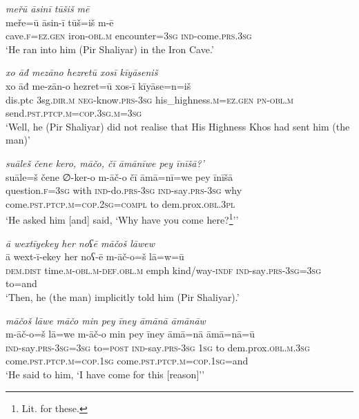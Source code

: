 \ea \label{ŽP.133}
\textit{meřū āsinī tūšiš mē} \\ 
\gll meře=ū āsin-ī tūš=iš m-ē \\ 
 cave\textsc{.f}\textsc{\textsc{=ez.gen}} iron\textsc{-obl}\textsc{.m} encounter\textsc{=3sg} \textsc{ind-}come\textsc{.prs}\textsc{.3sg} \\ 
\glt `He ran into him (Pir Shaliyar) in the Iron Cave.'
\z 
 
\ea \label{ŽP.134}
\textit{xo āđ mezāno hezretū xosī kīyāseniš} \\ 
\gll xo āđ me-zān-o hezret=ū xos-ī kīyāse=n=iš \\ 
 dis.ptc 3sg\textsc{.dir}\textsc{.m} \textsc{neg-}know\textsc{.prs}\textsc{-3sg} his\_highness\textsc{.m}\textsc{\textsc{=ez.gen}} \textsc{pn}\textsc{-obl}\textsc{.m} send\textsc{.pst}\textsc{.ptcp}\textsc{.m}\textsc{=cop}\textsc{.3sg}\textsc{.m}\textsc{=3sg} \\ 
\glt `Well, he (Pir Shaliyar) did not realise that His Highness Khos had sent him (the man)'
\z 
 
\ea \label{ŽP.135}
\textit{suāleš čene kero, māčo, čī āmānīwe pey īnīšā?’} \\ 
\gll suāle=š čene ∅-ker-o m-āč-o čī āmā=nī=we pey īnīšā \\ 
 question\textsc{.f}\textsc{=3sg} with \textsc{ind-}do\textsc{.prs}\textsc{-3sg} \textsc{ind-}say\textsc{.prs}\textsc{-3sg} why come\textsc{.pst}\textsc{.ptcp}\textsc{.m}\textsc{=cop}\textsc{.\textsc{2sg}}\textsc{=compl} to dem.prox\textsc{.obl}\textsc{.3pl} \\ 
\glt `He asked him [and] said, ‘Why have you come here?\footnote{Lit. for these.}’'
\z 
 
\ea \label{ŽP.137}
\textit{ā wextīyekey her noʕē māčoš lāwew} \\ 
\gll ā wext-ī-ekey her noʕ-ē m-āč-o=š lā=w=ū \\ 
 \textsc{dem.dist} time\textsc{.m}\textsc{-obl}\textsc{.m}\textsc{-def}\textsc{.obl}\textsc{.m} emph kind/way\textsc{-indf} \textsc{ind-}say\textsc{.prs}\textsc{-3sg}\textsc{=3sg} to=and \\ 
\glt `Then, he (the man) implicitly told him (Pir Shaliyar).'
\z 
 
\ea \label{ŽP.138}
\textit{māčoš lāwe māčo min pey īney āmānā āmānāw} \\ 
\gll m-āč-o=š lā=we m-āč-o min pey īney āmā=nā āmā=nā=ū \\ 
 \textsc{ind-}say\textsc{.prs}\textsc{-3sg}\textsc{=3sg} to\textsc{=\textsc{post}} \textsc{ind-}say\textsc{.prs}\textsc{-3sg} \textsc{1sg} to dem.prox\textsc{.obl}\textsc{.m}\textsc{.3sg} come\textsc{.pst}\textsc{.ptcp}\textsc{.m}\textsc{=cop}\textsc{.\textsc{1sg}} come\textsc{.pst}\textsc{.ptcp}\textsc{.m}\textsc{=cop}\textsc{.\textsc{1sg}}=and \\ 
\glt `He said to him, ‘I have come for this [reason]’'
\z 
 
